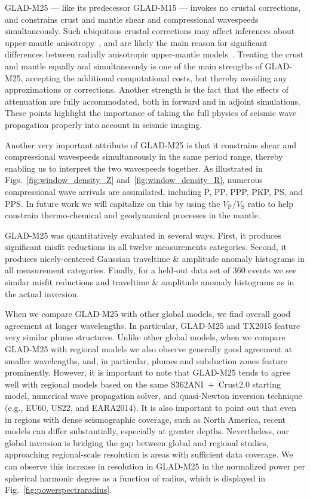 GLAD-M25 --- like its predecessor GLAD-M15 --- invokes no crustal corrections, and constrains crust and mantle shear and compressional wavespeeds simultaneously.
Such ubiquitous crustal corrections may affect inferences about upper-mantle anisotropy~\cite{BozdagTrampert2008,PaLeRo10,Ferreira10}, and are likely the main reason for significant differences between radially anisotropic upper-mantle models~\cite{Chang14}.
Treating the crust and mantle equally and simultaneously is one of the main strengths of GLAD-M25, accepting the additional computational costs, but thereby avoiding any approximations or corrections.
Another strength is the fact that the effects of attenuation are fully accommodated, both in forward and in adjoint simulations.
These points highlight the importance of taking the full physics of seismic wave propagation properly into account in seismic imaging. 

Another very important attribute of GLAD-M25 is that it constrains shear and compressional wavespeeds simultaneously in the same period range,
thereby enabling us to interpret the two wavespeeds together.
As illustrated in Figs.~\ref{fig:window_density_Z} and~\ref{fig:window_density_R},
numerous compressional wave arrivals are assimilated, including P, PP, PPP, PKP, PS, and PPS.
In future work we will capitalize on this by using the $V_\text{P}/V_\text{S}$ ratio to help constrain thermo-chemical and geodynamical processes in the mantle.

GLAD-M25 was quantitatively evaluated in several ways.
First, it produces significant misfit
reductions in all twelve measurements categories.
Second,
it produces nicely-centered Gaussian traveltime \& amplitude anomaly histograms
in all measurement categories.
Finally,
for a held-out data set of 360 events
we see similar misfit reductions and traveltime \& amplitude anomaly histograms as in the actual inversion.

When we compare GLAD-M25 with other global models,
we find overall good agreement at longer wavelengths.
In particular, GLAD-M25 and TX2015 feature very similar plume structures.
Unlike other global models, when we compare GLAD-M25 with regional models
we also observe generally good agreement at smaller wavelengths,
and, in particular, plumes and subduction zones feature prominently.
However, it is important to note that GLAD-M25 tends to agree well with regional models based on the same S362ANI~$+$~Crust2.0 starting model, numerical wave propagation solver, and quasi-Newton inversion technique (e.g., EU60, US22, and EARA2014).
It is also important to point out that even in regions with dense seismographic coverage, such as North America,
recent models can differ substantially, especially at greater depths.
Nevertheless, our global inversion is bridging the gap between global and regional studies,
approaching regional-scale resolution is areas with sufficient data coverage.
We can observe this increase in resolution in GLAD-M25 in the normalized power per spherical harmonic degree as a function of radius, which is displayed in Fig.~\ref{fig:powerspectraradius}.

